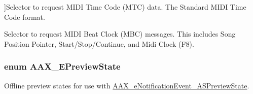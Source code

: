 \begin{Desc}
\begin{description}
{}]Selector to request M\+I\+D\+I Time Code (M\+T\+C) data. The Standard M\+I\+D\+I Time Code format. \item[{\em 
\hypertarget{a00206_a349dae6bc64bda67a5440cbc6637f92da7345d01457a861d2acb2e91d5669b803}{}A\+A\+X\+\_\+e\+M\+I\+D\+I\+Beat\+Clock\label{a00206_a349dae6bc64bda67a5440cbc6637f92da7345d01457a861d2acb2e91d5669b803}
}]Selector to request M\+I\+D\+I Beat Clock (M\+B\+C) messages. This includes Song Position Pointer, Start/\+Stop/\+Continue, and Midi Clock (F8). \end{description}
\end{Desc}
\hypertarget{a00206_a12b280d7ccf22568759f8deb1fe1d6a8}{}
\subsubsection[{A\+A\+X\+\_\+\+E\+Preview\+State}]{\setlength{\rightskip}{0pt plus 5cm}enum {\bf A\+A\+X\+\_\+\+E\+Preview\+State}}\label{a00206_a12b280d7ccf22568759f8deb1fe1d6a8}


Offline preview states for use with \hyperlink{a00206_afab5ea2cfd731fc8f163b6caa685406ea8ca3f7d5e93eecf945682f6fc55f5263}{A\+A\+X\+\_\+e\+Notification\+Event\+\_\+\+A\+S\+Preview\+State}. 

